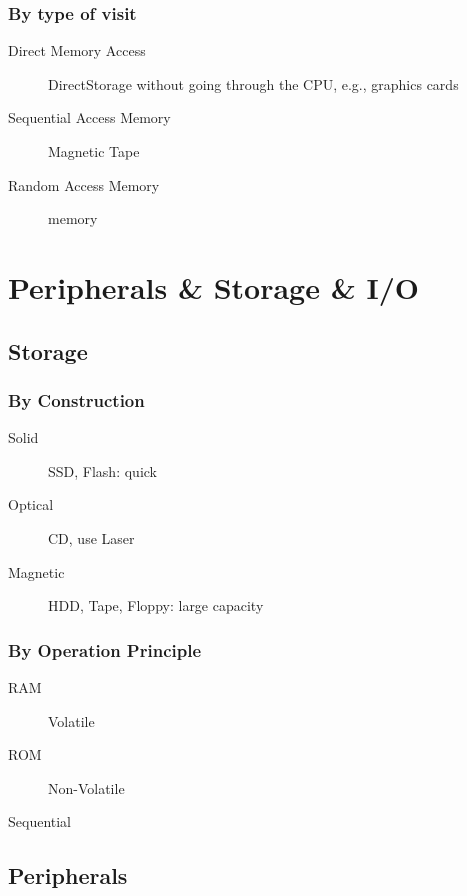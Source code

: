 \documentclass[11pt,journal,compsoc]{IEEEtran}
\begin{document}
\subsubsection{By type of visit}

\begin{description}
    \item[Direct Memory Access] DirectStorage without going through the CPU, e.g., graphics cards

    \item[Sequential Access Memory] Magnetic Tape

    \item[Random Access Memory] memory
\end{description}


\section{Peripherals \& Storage \& I/O}


\subsection{Storage}

\subsubsection{By Construction}

\begin{description}
    \item[Solid] SSD, Flash: quick

    \item[Optical] CD, use Laser

    \item[Magnetic] HDD, Tape, Floppy: large capacity
\end{description}

\subsubsection{By Operation Principle}

\begin{description}
    \item[RAM] Volatile
    \item[ROM] Non-Volatile
    \item[Sequential]
\end{description}


\subsection{Peripherals}
\end{document}
